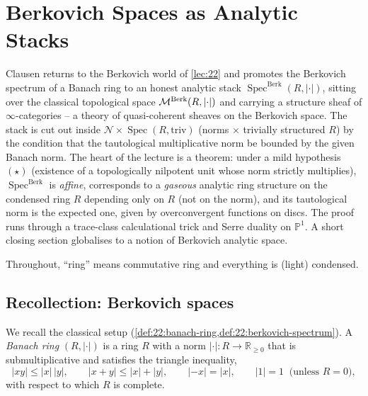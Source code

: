 \section{Berkovich Spaces as Analytic Stacks}
\label{lec:23}

Clausen returns to the Berkovich
world of \cref{lec:22} and promotes the Berkovich spectrum of a Banach ring to
an honest analytic stack $\operatorname{Spec}^{\mathrm{Berk}}(R,\lvert\cdot\rvert)$,
sitting over the classical topological space $\mathcal{M}^{\mathrm{Berk}}(R,\lvert\cdot\rvert)$ and
carrying a structure sheaf of $\infty$-categories -- a theory of
quasi-coherent sheaves on the Berkovich space. The stack is cut out inside
$\mathcal N\times\operatorname{Spec}(R,\mathrm{triv})$ (norms $\times$ trivially
structured $R$) by the condition that the tautological multiplicative norm be
bounded by the given Banach norm. The heart of the lecture is a theorem: under
a mild hypothesis $(\star)$ (existence of a topologically nilpotent unit whose
norm strictly multiplies), $\operatorname{Spec}^{\mathrm{Berk}}$ is
\emph{affine}, corresponds to a \emph{gaseous} analytic ring structure on the
condensed ring $R$ depending only on $R$ (not on the norm), and its tautological
norm is the expected one, given by overconvergent functions on discs. The proof
runs through a trace-class calculational trick and Serre duality on
$\mathbb P^1$. A short closing section globalises to a notion of Berkovich
analytic space.

Throughout, ``ring'' means commutative ring and everything is (light)
condensed.

\subsection{Recollection: Berkovich spaces}
\label{subsec:23:recollection}

We recall the classical setup (\cref{def:22:banach-ring,def:22:berkovich-spectrum}).
A \emph{Banach ring} $(R,\lvert\cdot\rvert)$ is a ring $R$ with a norm
$\lvert\cdot\rvert\colon R\to\mathbb R_{\ge0}$ that is submultiplicative and
satisfies the triangle inequality,
\begin{equation*}
\lvert xy\rvert\le\lvert x\rvert\,\lvert y\rvert,\qquad
\lvert x+y\rvert\le\lvert x\rvert+\lvert y\rvert,\qquad
\lvert-x\rvert=\lvert x\rvert,\qquad
\lvert1\rvert=1\ \text{ (unless } R=0\text{)},
\end{equation*}
with respect to which $R$ is complete.


